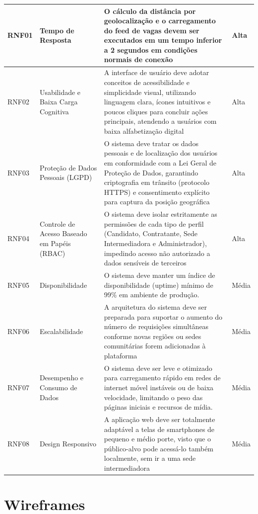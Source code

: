 \documentclass[
    12pt,
    oneside,
    a4paper,
    brazil
]{abntex2}
\begin{document}
\begin{xltabular}{\textwidth}{>{\raggedright\arraybackslash}p{1.2cm} >{\raggedright\arraybackslash}p{2.7cm} X >{\raggedleft\arraybackslash}p{2cm}}
    RNF01 & Tempo de Resposta & O cálculo da distância por geolocalização e o carregamento do feed de vagas devem ser executados em um tempo inferior a 2 segundos em condições normais de conexão & Alta \\ \hline
    RNF02 & Usabilidade e Baixa Carga Cognitiva & A interface de usuário deve adotar conceitos de acessibilidade e simplicidade visual, utilizando linguagem clara, ícones intuitivos e poucos cliques para concluir ações principais, atendendo a usuários com baixa alfabetização digital & Alta \\ \hline
    RNF03 & Proteção de Dados Pessoais (LGPD) & O sistema deve tratar os dados pessoais e de localização dos usuários em conformidade com a Lei Geral de Proteção de Dados, garantindo criptografia em trânsito (protocolo HTTPS) e consentimento explícito para captura da posição geográfica & Alta \\ \hline
    RNF04 & Controle de Acesso Baseado em Papéis (RBAC) & O sistema deve isolar estritamente as permissões de cada tipo de perfil (Candidato, Contratante, Sede Intermediadora e Administrador), impedindo acesso não autorizado a dados sensíveis de terceiros & Alta \\ \hline
    RNF05 & Disponibilidade & O sistema deve manter um índice de disponibilidade (uptime) mínimo de 99\% em ambiente de produção. & Média \\ \hline
    RNF06 & Escalabilidade & A arquitetura do sistema deve ser preparada para suportar o aumento do número de requisições simultâneas conforme novas regiões ou sedes comunitárias forem adicionadas à plataforma & Média \\ \hline
    RNF07 & Desempenho e Consumo de Dados & O sistema deve ser leve e otimizado para carregamento rápido em redes de internet móvel instáveis ou de baixa velocidade, limitando o peso das páginas iniciais e recursos de mídia. & Média \\ \hline
    RNF08 & Design Responsivo & A aplicação web deve ser totalmente adaptável a telas de smartphones de pequeno e médio porte, visto que o público-alvo pode acessá-lo também localmente, sem ir a uma sede intermediadora & Média \\ \hline

\end{xltabular}


\chapter{Wireframes}
\end{document}
